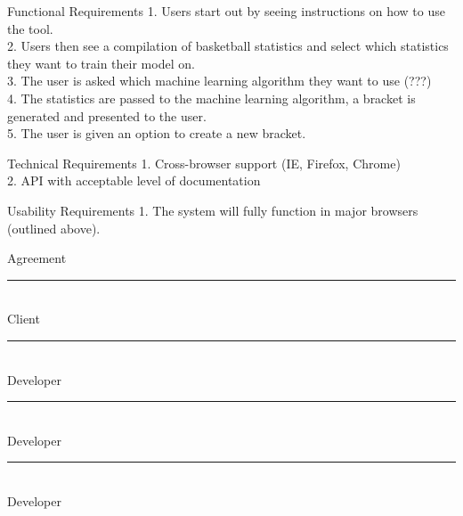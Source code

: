 \documentclass[letterpaper, 10pt,titlepage]{article}
\begin{document}
\newpage


\begin{section}{Functional Requirements}
1.       Users start out by seeing instructions on how to use the tool. \\
2.       Users then see a compilation of basketball statistics and select which statistics they want to train their model on. \\
3.   	The user is asked which machine learning algorithm they want to use (???) \\
4.       The statistics are passed to the machine learning algorithm, a bracket is generated and presented to the user. \\
5.       The user is given an option to create a new bracket. \\


\end{section}

\begin{section}{Technical Requirements}
1.       Cross-browser support (IE, Firefox, Chrome) \\
2.       API with acceptable level of documentation \\


\end{section}

\begin{section}{Usability Requirements}
1.       The system will fully function in major browsers (outlined above). \\


\end{section}





\newpage
\begin{section}{Agreement}
\textbf{ }
\vspace{5.0cm}

\noindent\rule{13cm}{0.4pt}\\
Client
\vspace{3.0cm}

\noindent\rule{13cm}{0.4pt}\\
Developer
\vspace{3.0cm}


\noindent\rule{13cm}{0.4pt}\\
Developer
\vspace{3.0cm}


\noindent\rule{13cm}{0.4pt}\\
Developer
\vspace{3.0cm}

\end{section}
\end{document}
